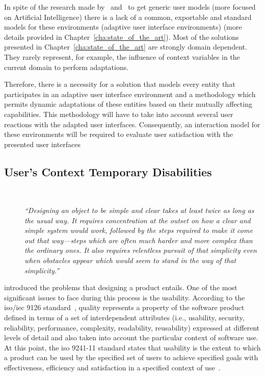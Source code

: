 In spite of the research made by~\citet{kobsa_generic_2001}
and~\citet{fink_review_2000} to get generic user models (more focused on 
Artificial Intelligence) there is a lack of a common, exportable and standard 
models for these environments (adaptive user interface environments) (more 
details provided in Chapter~\ref{cha:state_of_the_art}). Most of the solutions 
presented in Chapter~\ref{cha:state_of_the_art} are strongly domain dependent. 
They rarely represent, for example, the influence of context variables in 
the current domain to perform adaptations. 

Therefore, there is a necessity for a solution that models every entity that
participates in an adaptive user interface environment and a methodology which
permits dynamic adaptations of these entities based on their mutually affecting
capabilities. This methodology will have to take into account several user
reactions with the adapted user interfaces. Consequently, an interaction model
for these environments will be required to evaluate user satisfaction with the
presented user interfaces


\subsection{User's Context Temporary Disabilities}
\label{sec:context_disabilities}

\begin{description}
  \item[] \hfill \\
  \begin{mdframed}[hidealllines=true,backgroundcolor=gray!20]
  \textit{``Designing an object to be simple and clear takes at least twice as long as 
  the usual way. It requires concentration at the outset on how a clear and 
  simple system would work, followed by the steps required to make it come out 
  that way—steps which are often much harder and more complex than the ordinary 
  ones. It also requires relentless pursuit of that simplicity even when obstacles 
  appear which would seem to stand in the way of that simplicity.'' }
  \end{mdframed}
\end{description}  
  
\citeauthor{nelson1977home} introduced the problems that designing 
a product entails. One of the most significant issues to face during this process 
is the usability. According to the \acs{iso}/\acs{iec} 9126 standard~\citep{isoiec1}, 
quality represents a property of the software product defined in terms of a set 
of interdependent attributes (i.e., usability, security, reliability, performance, 
complexity, readability, reusability) expressed at different levels of detail 
and also taken into account the particular context of software use. At this 
point, the \acs{iso} 9241-11 standard states that usability is the extent to 
which a product can be used by the specified set of users to achieve specified 
goals with effectiveness, efficiency and satisfaction in a specified context of 
use~\citep{iso9241}.

